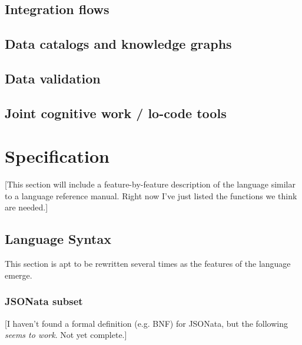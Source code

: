 \documentclass[9pt,letterpaper]{article}
\begin{document}
\subsection{Integration flows}

\subsection{Data catalogs and knowledge graphs}

\subsection{Data validation}

\subsection{Joint cognitive work / lo-code tools}

\section{Specification}

[This section will include a feature-by-feature description of the language similar to a language reference manual. Right now I've just listed the functions we think are needed.]

\subsection{Language Syntax}
This section is apt to be rewritten several times as the features of the language emerge. 

\subsubsection{JSONata subset}
[I haven't found a formal definition (e.g. BNF) for JSONata, but the following \textit{seems to work}. Not yet complete.]
\end{document}
